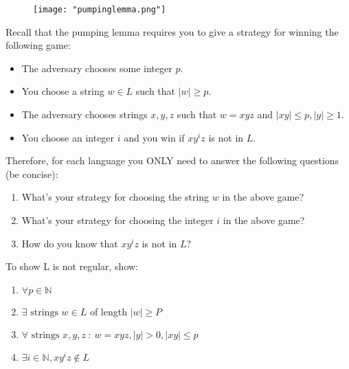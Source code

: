 \begin{figure}[htp]
  \centering
  \texttt{[image: "pumpinglemma.png"]}
\end{figure}

Recall that the pumping lemma requires you to give a strategy for winning the following game:
\begin{itemize}
  \item The adversary chooses some integer $p$.
  \item You choose a string $w \in L$ such that $|w| \geq p$.
  \item The adversary chooses strings $x,y,z$ such that $w = xyz$ and $|xy| \leq p, |y| \geq 1$.
  \item You choose an integer $i$ and you win if $xy^iz$ is not in $L$.
\end{itemize}
Therefore, for each language you ONLY need to answer the following questions (be concise):
\begin{enumerate}
  \item What's your strategy for choosing the string $w$ in the above game?
  \item What's your strategy for choosing  the integer $i$ in the above game?
  \item How do you know that $xy^iz$ is not in $L$? 
\end{enumerate}
To show L is not regular, show:
\begin{enumerate}
  \item $\forall p \in \mathbb{N}$
  \item $\exists \text{ strings } w \in L$ of length $|w| \geq P$
  \item $\forall \text{ strings } x,y,z \: : \: w = xyz, |y| > 0, |xy| \leq p$
  \item $\exists i \in \mathbb{N}, x y^i z \notin L$
\end{enumerate}